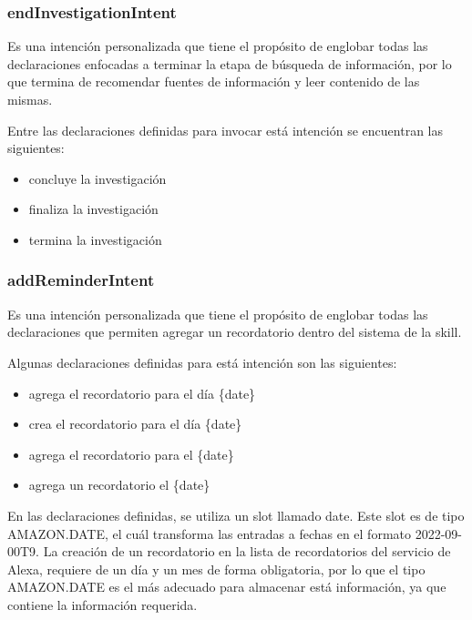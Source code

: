 
\subsubsection{endInvestigationIntent}
\label{endInvestigationIntentcapIV}

Es una intención personalizada que tiene el propósito de englobar todas las declaraciones enfocadas a terminar la etapa de búsqueda de información, por lo que termina de recomendar fuentes de información y leer contenido de las mismas.

Entre las declaraciones definidas para invocar está intención se encuentran las siguientes:

\begin{itemize}
  \item concluye la investigación
  \item finaliza la investigación
  \item termina la investigación
\end{itemize}


\subsubsection{addReminderIntent}
\label{addReminderIntentcapIV}

Es una intención personalizada que tiene el propósito de englobar todas las declaraciones que permiten agregar un recordatorio dentro del sistema de la skill.

Algunas declaraciones definidas para está intención son las siguientes:

\begin{itemize}
  \item agrega el recordatorio para el día \{date\}
  \item crea el recordatorio para el día \{date\}
  \item agrega el recordatorio para el \{date\}
  \item agrega un recordatorio el \{date\}
\end{itemize}

En las declaraciones definidas, se utiliza un slot llamado date. Este slot es de tipo AMAZON.DATE, el cuál transforma las entradas a fechas en el formato 2022-09-00T9. La creación de un recordatorio en la lista de recordatorios del servicio de Alexa, requiere de un día y un mes de forma obligatoria, por lo que el tipo AMAZON.DATE es el más adecuado para almacenar está información, ya que contiene la información requerida.

